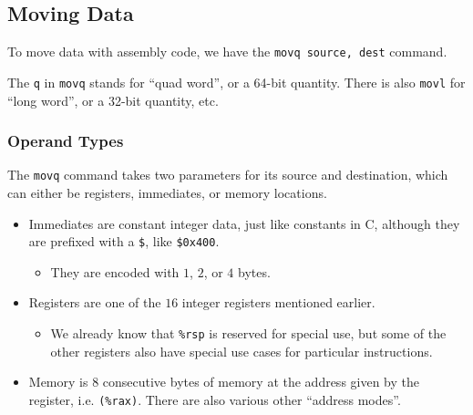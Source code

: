 \documentclass[class=article, crop=false]{standalone}
\begin{document}
  \subsection{Moving Data}
  To move data with assembly code, we have the \texttt{movq source, dest} command.
  \begin{note}{}
    The \texttt{q} in \texttt{movq} stands for ``quad word'', or a 64-bit quantity. There is also \texttt{movl} for ``long word'', or a 32-bit quantity, etc.
  \end{note}
  \subsubsection{Operand Types}
  The \texttt{movq} command takes two parameters for its source and destination, which can either be registers, immediates, or memory locations.
  \begin{itemize}
    \item Immediates are constant integer data, just like constants in C, although they are prefixed with a \texttt{\$}, like \texttt{\$0x400}.
    \begin{itemize}
      \item They are encoded with $1$, $2$, or $4$ bytes.
    \end{itemize}
    \item Registers are one of the $16$ integer registers mentioned earlier.
    \begin{itemize}
      \item We already know that \texttt{\%rsp} is reserved for special use, but some of the other registers also have special use cases for particular instructions.
    \end{itemize}
    \item Memory is $8$ consecutive bytes of memory at the address given by the register, i.e. \texttt{(\%rax)}. There are also various other ``address modes''.
  \end{itemize}
\end{document}
